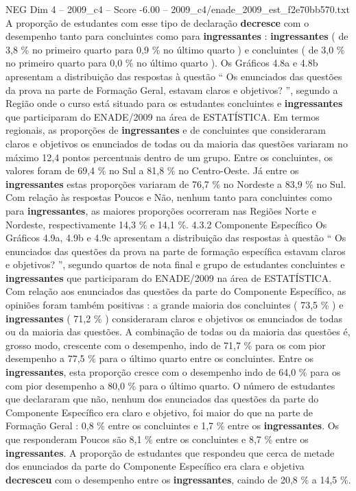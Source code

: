 \begin{textsample}{NEG Dim 4 – 2009\_c4 – Score -6.00 – 2009\_c4/enade\_2009\_est\_f2e70bb570.txt}
A proporção de estudantes com esse tipo de declaração \textbf{decresce} com o desempenho tanto para concluintes como para \textbf{ingressantes} : \textbf{ingressantes} ( de 3,8 \% no primeiro quarto para 0,9 \% no último quarto ) e concluintes ( de 3,0 \% no primeiro quarto para 0,0 \% no último quarto ).
Os Gráficos 4.8a e 4.8b apresentam a distribuição das respostas à questão “ Os enunciados das questões da prova na parte de Formação Geral, estavam claros e objetivos? ”, segundo a Região onde o curso está situado para os estudantes concluintes e \textbf{ingressantes} que participaram do ENADE/2009 na área de ESTATÍSTICA.
Em termos regionais, as proporções de \textbf{ingressantes} e de concluintes que consideraram claros e objetivos os enunciados de todas ou da maioria das questões variaram no máximo 12,4 pontos percentuais dentro de um grupo.
Entre os concluintes, os valores foram de 69,4 \% no Sul a 81,8 \% no Centro-Oeste.
Já entre os \textbf{ingressantes} estas proporções variaram de 76,7 \% no Nordeste a 83,9 \% no Sul.
Com relação às respostas Poucos e Não, nenhum tanto para concluintes como para \textbf{ingressantes}, as maiores proporções ocorreram nas Regiões Norte e Nordeste, respectivamente 14,3 \% e 14,1 \%. 4.3.2 Componente Específico Os Gráficos 4.9a, 4.9b e 4.9c apresentam a distribuição das respostas à questão “ Os enunciados das questões da prova na parte de formação específica estavam claros e objetivos? ”, segundo quartos de nota final e grupo de estudantes concluintes e \textbf{ingressantes} que participaram do ENADE/2009 na área de ESTATÍSTICA.
Com relação aos enunciados das questões da parte do Componente Específico, as opiniões foram também positivas : a grande maioria dos concluintes ( 73,5 \% ) e \textbf{ingressantes} ( 71,2 \% ) consideraram claros e objetivos os enunciados de todas ou da maioria das questões.
A combinação de todas ou da maioria das questões é, grosso modo, crescente com o desempenho, indo de 71,7 \% para os com pior desempenho a 77,5 \% para o último quarto entre os concluintes.
Entre os \textbf{ingressantes}, esta proporção cresce com o desempenho indo de 64,0 \% para os com pior desempenho a 80,0 \% para o último quarto.
O número de estudantes que declararam que não, nenhum dos enunciados das questões da parte do Componente Específico era claro e objetivo, foi maior do que na parte de Formação Geral : 0,8 \% entre os concluintes e 1,7 \% entre os \textbf{ingressantes}.
Os que responderam Poucos são 8,1 \% entre os concluintes e 8,7 \% entre os \textbf{ingressantes}.
A proporção de estudantes que respondeu que cerca de metade dos enunciados da parte do Componente Específico era clara e objetiva \textbf{decresceu} com o desempenho entre os \textbf{ingressantes}, caindo de 20,8 \% a 14,5 \%.

\end{textsample}
